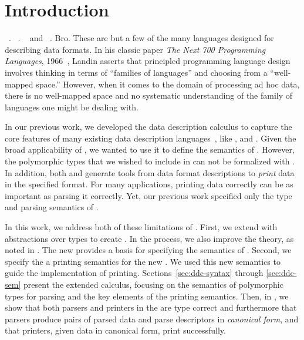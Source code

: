 \section{Introduction}
\label{sec:intro}

\datascript{}~\cite{gpce02}. \packettypes{}~\cite{sigcomm00}. \padsc{}~\cite{fisher+:pads}
and \padsml{}~\cite{mandelbaum+:padsml}. Bro\cite{paxson:bro}. These
are but a few of the many languages designed for describing data
formats. In his classic paper {\em The Next 700 Programming
  Languages}, 1966~\cite{landin:700}, Landin asserts that principled
programming language design involves thinking in terms of ``families
of languages'' and choosing from a ``well-mapped space.''  However,
when it comes to the domain of processing ad hoc data, there is no
well-mapped space and no systematic understanding of the family of
languages one might be dealing with.

In our previous work, we developed the data description calculus
\ddcold{} to capture the core features of many existing data
description languages~\cite{fisher+:next700ddl}, like \padsc{},
\packettypes{} and \datascript{}. Given the broad applicability of
\ddcold{}, we wanted to use it to define the semantics of
\padsml{}. However, the polymorphic types that we wished to include in
\padsml{} can not be formalized with \ddcold{}.  In addition, both
\padsc{} and \padsml{} generate tools from data format descriptions to
{\em print} data in the specified format. For
many applications, printing data correctly can be as important as
parsing it correctly. Yet, our previous work
specified only the type and parsing semantics of \ddcold{}. 

In this work, we address both of these limitations of
\ddcold{}. First, we extend \ddcold{} with abstractions over types to
create \ddc. In the process, we also improve the \ddcold{} theory, as
noted in . The new \ddc{} provides a basis for
specifying the semantics of \padsml{}. Second, we specify the a
printing semantics for the new \ddc{}.  We used this new semantics to
guide the \padsml{} implementation of printing.
Sections~\ref{sec:ddc-syntax} through \ref{sec:ddc-sem} present the
extended \ddc{} calculus, focusing on the semantics of polymorphic
types for parsing and the key elements of the printing semantics.
Then, in , we show that both parsers and
printers in the \ddc{} are type correct and furthermore that parsers
produce pairs of parsed data and parse descriptors in {\em canonical
  form}, and that printers, given data in canonical form, print
successfully.

